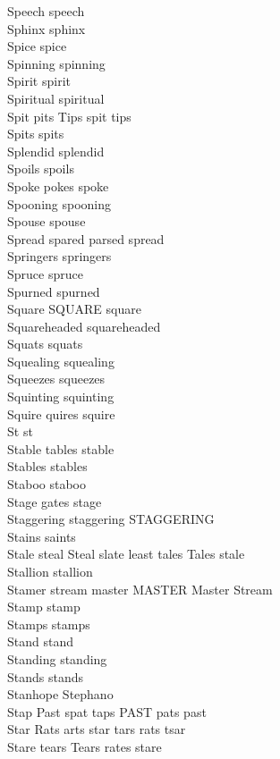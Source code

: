 Speech speech\\
Sphinx sphinx\\
Spice spice\\
Spinning spinning\\
Spirit spirit\\
Spiritual spiritual\\
Spit pits Tips spit tips\\
Spits spits\\
Splendid splendid\\
Spoils spoils\\
Spoke pokes spoke\\
Spooning spooning\\
Spouse spouse\\
Spread spared parsed spread\\
Springers springers\\
Spruce spruce\\
Spurned spurned\\
Square SQUARE square\\
Squareheaded squareheaded\\
Squats squats\\
Squealing squealing\\
Squeezes squeezes\\
Squinting squinting\\
Squire quires squire\\
St st\\
Stable tables stable\\
Stables stables\\
Staboo staboo\\
Stage gates stage\\
Staggering staggering STAGGERING\\
Stains saints\\
Stale steal Steal slate least tales Tales stale\\
Stallion stallion\\
Stamer stream master MASTER Master Stream\\
Stamp stamp\\
Stamps stamps\\
Stand stand\\
Standing standing\\
Stands stands\\
Stanhope Stephano\\
Stap Past spat taps PAST pats past\\
Star Rats arts star tars rats tsar\\
Stare tears Tears rates stare\\
